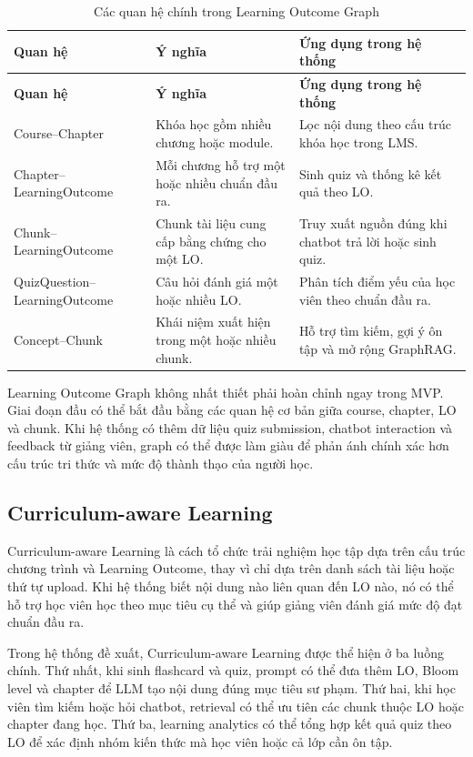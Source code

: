 \begin{longtable}{|p{3.2cm}|p{4.2cm}|p{6.6cm}|}
\caption{Các quan hệ chính trong Learning Outcome Graph}
\label{tab:learning-outcome-graph-relations}\\
\hline
\textbf{Quan hệ} & \textbf{Ý nghĩa} & \textbf{Ứng dụng trong hệ thống} \\
\hline
\endfirsthead
\hline
\textbf{Quan hệ} & \textbf{Ý nghĩa} & \textbf{Ứng dụng trong hệ thống} \\
\hline
\endhead
Course--Chapter & Khóa học gồm nhiều chương hoặc module. & Lọc nội dung theo cấu trúc khóa học trong LMS. \\
\hline
Chapter--LearningOutcome & Mỗi chương hỗ trợ một hoặc nhiều chuẩn đầu ra. & Sinh quiz và thống kê kết quả theo LO. \\
\hline
Chunk--LearningOutcome & Chunk tài liệu cung cấp bằng chứng cho một LO. & Truy xuất nguồn đúng khi chatbot trả lời hoặc sinh quiz. \\
\hline
QuizQuestion--LearningOutcome & Câu hỏi đánh giá một hoặc nhiều LO. & Phân tích điểm yếu của học viên theo chuẩn đầu ra. \\
\hline
Concept--Chunk & Khái niệm xuất hiện trong một hoặc nhiều chunk. & Hỗ trợ tìm kiếm, gợi ý ôn tập và mở rộng GraphRAG. \\
\hline
\end{longtable}

Learning Outcome Graph không nhất thiết phải hoàn chỉnh ngay trong MVP. Giai
đoạn đầu có thể bắt đầu bằng các quan hệ cơ bản giữa course, chapter, LO và
chunk. Khi hệ thống có thêm dữ liệu quiz submission, chatbot interaction và
feedback từ giảng viên, graph có thể được làm giàu để phản ánh chính xác hơn cấu
trúc tri thức và mức độ thành thạo của người học.

\subsection{Curriculum-aware Learning}
\label{subsec:curriculum-aware-learning}

Curriculum-aware Learning là cách tổ chức trải nghiệm học tập dựa trên cấu trúc
chương trình và Learning Outcome, thay vì chỉ dựa trên danh sách tài liệu hoặc
thứ tự upload. Khi hệ thống biết nội dung nào liên quan đến LO nào, nó có thể
hỗ trợ học viên học theo mục tiêu cụ thể và giúp giảng viên đánh giá mức độ đạt
chuẩn đầu ra.

Trong hệ thống đề xuất, Curriculum-aware Learning được thể hiện ở ba luồng chính.
Thứ nhất, khi sinh flashcard và quiz, prompt có thể đưa thêm LO, Bloom level và
chapter để LLM tạo nội dung đúng mục tiêu sư phạm. Thứ hai, khi học viên tìm
kiếm hoặc hỏi chatbot, retrieval có thể ưu tiên các chunk thuộc LO hoặc chapter
đang học. Thứ ba, learning analytics có thể tổng hợp kết quả quiz theo LO để
xác định nhóm kiến thức mà học viên hoặc cả lớp cần ôn tập.

